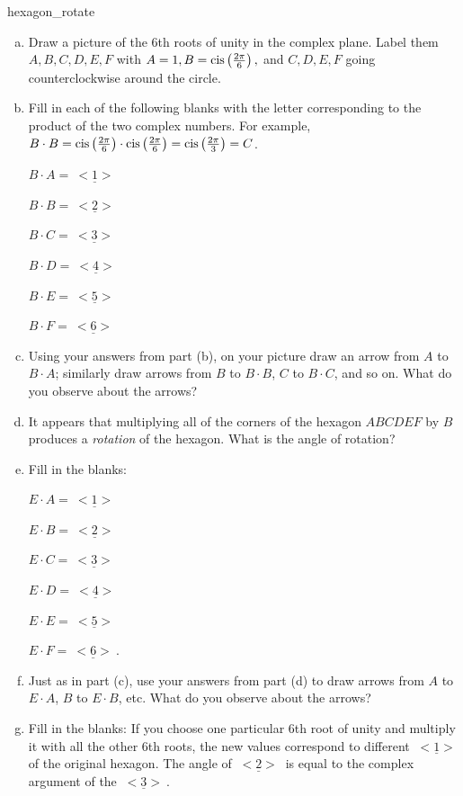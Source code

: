 \begin{exercise}{hexagon_rotate}
\begin{enumerate}[(a)]
\item
Draw a picture of the  6th roots of unity in the complex plane. Label them $A,B,C,D,E,F$ with $A=1, B= \operatorname{cis}\left(\frac{2\pi}{6}\right),$ and $C,D,E,F$ going counterclockwise around the circle.
\item
Fill in each of the following blanks with the letter corresponding to the product of the two complex numbers. For example,  $B \cdot B = \operatorname{cis}\left(\frac{2\pi}{6}\right) \cdot \operatorname{cis}\left(\frac{2\pi}{6}\right) = \operatorname{cis}\left(\frac{2\pi}{3}\right) = C$.

\begin{multicols}{3}
$B \cdot A = \underline{~<1>~}$

$B \cdot B = \underline{~<2>~}$ 

$B \cdot C = \underline{~<3>~}$

$B \cdot D = \underline{~<4>~}$

$B \cdot E = \underline{~<5>~}$ 

$B \cdot F = \underline{~<6>~}$
\end{multicols}

\item
Using your answers from part (b), on your picture draw an arrow from $A$ to $B \cdot A$; similarly draw arrows from $B$ to $B \cdot B$, $C$ to $B \cdot C$, and so on. What do you observe about the arrows?
\item
It appears that multiplying all of the corners of the hexagon $ABCDEF$ by $B$ produces a \emph{rotation} of the hexagon. What is the angle of rotation?
\item
Fill in the blanks:
\begin{multicols}{3}
$E \cdot A = \underline{~<1>~}$

 $E \cdot B = \underline{~<2>~}$

 $E \cdot C = \underline{~<3>~}$

$E \cdot D = \underline{~<4>~}$

$E \cdot E = \underline{~<5>~}$

 $E \cdot F = \underline{~<6>~}$.

\end{multicols}

\item Just as in part (c), use your answers from part (d) to draw arrows from $A$ to $E \cdot A$, $B$ to $E \cdot B$, etc. What do you observe about the arrows? 

\item
Fill in the blanks:  If you choose one particular 6th root of unity and multiply it with all the other 6th roots, the new values correspond to different $\underline{~<1>~}$ of the original hexagon. The angle of $\underline{~<2>~}$ is equal to the complex argument of the $\underline{~<3>~}$.
\end{enumerate}
\end{exercise}

